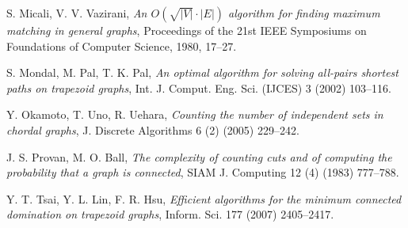 \documentclass[11pt,letter]{article}
\begin{document}
\begin{thebibliography}{99}
    S. Micali, V. V. Vazirani,
    \emph{An $O(\sqrt{|V|} \cdot|E|)$ algorithm for finding maximum matching in general graphs},
    Proceedings of the 21st IEEE Symposiums on Foundations of Computer Science, 1980, 17--27.

     S. Mondal, M. Pal, T. K. Pal,
     \emph{An optimal algorithm for solving all-pairs shortest paths on trapezoid graphs},
     Int. J. Comput. Eng. Sci. (IJCES) 3 (2002) 103--116.

    Y. Okamoto, T. Uno, R. Uehara,
    \emph{Counting the number of independent sets in chordal graphs},
    J. Discrete Algorithms 6 (2) (2005) 229--242.

    J. S. Provan, M. O. Ball,
    \emph{The complexity of counting cuts and of computing the probability that a graph is connected},
    SIAM J. Computing 12 (4) (1983) 777--788.

    Y. T. Tsai, Y. L. Lin, F. R. Hsu,
    \emph{Efficient algorithms for the minimum connected domination on trapezoid graphs},
    Inform. Sci. 177 (2007) 2405--2417.


\end{thebibliography}
\end{document}
